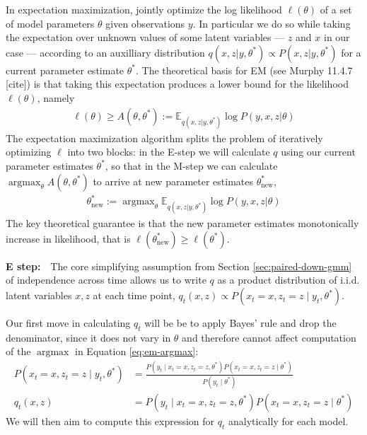 \documentclass{article}         %
\DeclareMathOperator{\argmax}{\arg\max}
\newcommand{\EE}{\mathbb{E}}
\begin{document}
In expectation maximization, jointly optimize the log likelihood $\ell(\theta)$ of a set of model parameters $\theta$ given observations $y$. In particular we do so while taking the expectation over unknown values of some latent variables --- $z$ and $x$ in our case --- according to an auxilliary distribution $q(x, z | y, \theta^*) \propto P(x, z | y, \theta^*)$ for a current parameter estimate $\theta^*$. The theoretical basis for EM (see Murphy 11.4.7 [cite]) is that taking this expectation produces a lower bound for the likelihood $\ell(\theta)$, namely
\begin{align}
    \ell(\theta) \geq A(\theta, \theta^*) := \EE_{q(x, z | y, \theta^*)} \log P(y, x, z | \theta)
\end{align}
The expectation maximization algorithm splits the problem of iteratively optimizing $\ell$ into two blocks: in the E-step we will calculate $q$ using our current parameter estimates $\theta^*$, so that in the M-step we can calculate $\argmax_\theta A(\theta, \theta^*)$ to arrive at new parameter estimates $\theta^*_{\text{new}}$,
\begin{align}
    \theta^*_{\text{new}} := \argmax_{\theta} \EE_{q(x, z | y, \theta^*)} \log P(y, x, z | \theta) \label{eq:em-argmax}
\end{align}
The key theoretical guarantee is that the new parameter estimates monotonically increase in likelihood, that is $\ell(\theta^*_{\text{new}}) \geq \ell(\theta^*)$.



\textbf{E step:}\ \ The core simplifying assumption from Section \ref{sec:paired-down-gmm} of independence across time allows us to write $q$ as a product distribution of i.i.d. latent variables $x, z$ at each time point, $q_t(x, z) \propto P(x_t = x, z_t = z \mid y_t, \theta^*)$.

Our first move in calculating $q_t$ will be be to apply Bayes' rule and drop the denominator, since it does not vary in $\theta$ and therefore cannot affect computation of the $\argmax$ in Equation \ref{eq:em-argmax}:
\begin{align}
    \label{eq:latent-posterior-bayes}
    P(x_t = x, z_t = z \mid y_t, \theta^*) &= \frac{P(y_t \mid x_t = x, z_t = z, \theta^*)P(x_t = x, z_t = z \mid \theta^*)}{P(y_t \mid \theta^*)} \\
    q_t(x, z) &= P(y_t \mid x_t = x, z_t = z, \theta^*)P(x_t = x, z_t = z \mid \theta^*) \label{eq:general-qt}
\end{align}
We will then aim to compute this expression for $q_t$ analytically for each model.
\end{document}
